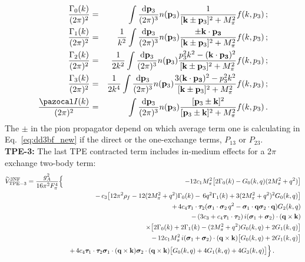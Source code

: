 \begin{eqnarray}
\label{eq:gamma0}
\frac{\Gamma_0(k)}{(2\pi)^2}&=& \qquad \int\frac{{\mathrm d}{\bf p}_3}{(2\pi)^3}n({\bf p}_3)
\frac{1}{[{\bf k}\pm{\bf p}_3]^2 + M_\pi^2}f(k,p_3)\,;
\\ \label{eq:gamma1}
\frac{\Gamma_1(k)}{(2\pi)^2}&=&\frac{1}{k^2}\int\frac{{\mathrm d}{\bf p}_3}{(2\pi)^3}n({\bf p}_3)
\frac{\pm{\bf k}\cdot{\bf p_3}}{[{\bf k}\pm{\bf p}_3]^2 + M_\pi^2}f(k,p_3)\,;
\\ \label{eq:gamma2}
\frac{\Gamma_2(k)}{(2\pi)^2}&=&\frac{1}{2k^2}\int\frac{{\mathrm d}{\bf p}_3}{(2\pi)^3}n({\bf p}_3)
\frac{p_3^2k^2-({\bf k}\cdot{\bf p_3})^2}{[{\bf k}\pm{\bf p}_3]^2 + M_\pi^2}f(k,p_3)\,;
\\ \label{eq:gamma3}
\frac{\Gamma_3(k)}{(2\pi)^2}&=&\frac{1}{2k^4}\int\frac{{\mathrm d}{\bf p}_3}{(2\pi)^3}n({\bf p}_3)
\frac{3({\bf k}\cdot{\bf p_3})^2-p_3^2k^2}{[{\bf k}\pm{\bf p}_3]^2 + M_\pi^2}f(k,p_3)\,;
\\ \label{eq:i_integral}
\frac{{\pazocal I}(k)}{(2\pi)^2}&=& \qquad  \int \frac{{\mathrm d}{\bf p}_3}{(2\pi)^3}n({\bf p}_3)
\frac{[{\bf p}_3\pm{\bf k}]^2}{[{\bf p}_3\pm{\bf k}]^2 + M_\pi^2}f(k,p_3)\,.
\end{eqnarray}
The $\pm$ in the pion propagator depend on which average term one is calculating in Eq.~\eqref{eq:dd3bf_new} if the direct or the one-exchange terms, $P_{13}$ or $P_{23}$.\\
\noindent
{\bf TPE-3:} The last TPE contracted term includes in-medium effects for a 2$\pi$ exchange two-body term:
\begin{eqnarray}
\nonumber 
\widetilde V_\mathrm{TPE-3}^\mathrm{3NF} = \frac{g_A^2}{16\pi^2F_\pi^4}
  &\Big\{ & -12c_1M_\pi^2\big[2\Gamma_0(k)-G_0(k,q)(2M_\pi^2+q^2)\big]
\\\nonumber &&   %
- \, c_3\big[12\pi^2\rho_f-12(2M_\pi^2+q^2)\Gamma_0(k)
- \, 6q^2\Gamma_1(k)+3(2M_\pi^2+q^2)^2G_0(k,q)\big] 
\\\nonumber &&  %
+  \, 4c_4 \boldsymbol\tau_1\cdot\boldsymbol\tau_2(\boldsymbol\sigma_1\cdot\boldsymbol\sigma_2\, q^2-\boldsymbol\sigma_1\cdot{\bf q}\boldsymbol\sigma_2\cdot{\bf q})
G_2(k,q)
\\\nonumber &&  %
-\, (3c_3+c_4\boldsymbol\tau_1\cdot\boldsymbol\tau_2)\,i(\boldsymbol\sigma_1+\boldsymbol\sigma_2)\cdot({\bf q}\times{\bf k})
\\\nonumber &&  \qquad \qquad \qquad \qquad \times
\big[2\Gamma_0(k)+2\Gamma_1(k)-(2M_\pi^2+q^2)G_0(k,q)+2G_1(k,q)\big]
\\\nonumber &&  %
- \, 12c_1M_\pi^2\,  i(\boldsymbol\sigma_1+\boldsymbol\sigma_2)\cdot({\bf q}\times{\bf k})
\big[G_0(k,q)+2G_1(k,q)\big]
\\ &&  %
+ \, 4c_4\boldsymbol\tau_1\cdot\boldsymbol\tau_2\boldsymbol\sigma_1\cdot({\bf q}\times{\bf k})\boldsymbol\sigma_2\cdot({\bf q}\times{\bf k})
\big[G_0(k,q)+4G_1(k,q)+4G_3(k,q)\big]\Big\} \,. \qquad \qquad 
\label{eq:tpe_dd_3}
\end{eqnarray}
